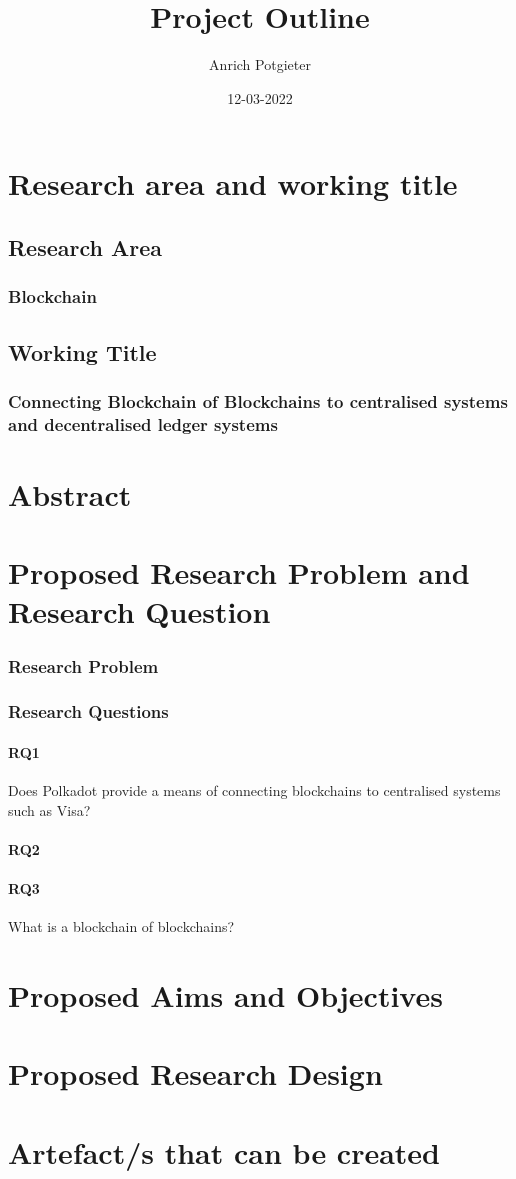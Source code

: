 \documentclass[12pt]{article}
\title{Project Outline}
\author{Anrich Potgieter}
\date{12-03-2022}
\begin{document}
\maketitle
\tableofcontents

\section{Research area and working title}
\subsection{Research Area}
\subsubsection{Blockchain}

\subsection{Working Title}
\subsubsection{Connecting Blockchain of Blockchains to centralised systems and decentralised ledger systems}

\section{Abstract}

\section{Proposed Research Problem and Research Question}
\subsubsection{Research Problem}

\subsubsection{Research Questions}
\paragraph{RQ1} Does Polkadot provide a means of connecting blockchains to centralised systems such as Visa?
\paragraph{RQ2} 
\paragraph{RQ3} What is a blockchain of blockchains?
\section{Proposed Aims and Objectives}
\section{Proposed Research Design}
\section{Artefact/s that can be created}

\printbibliography
\end{document}

